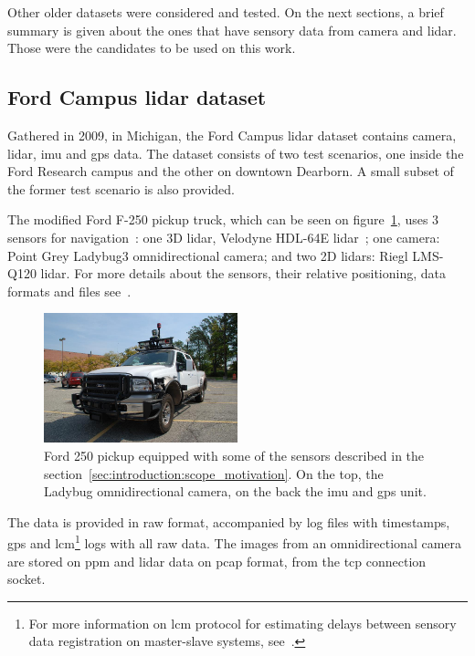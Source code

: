 Other older datasets were considered and tested. On the next sections, a brief summary is given about the ones that have sensory data from camera and \ac{lidar}. Those were the candidates to be used on this work.

\subsection{Ford Campus \acl{lidar} dataset}
Gathered in 2009, in Michigan, the Ford Campus \ac{lidar} dataset contains camera, \ac{lidar}, \acf{imu} and \acf{gps} data\cite{Pandey2011}. The dataset consists of two test scenarios, one inside the Ford Research campus and the other on downtown Dearborn. A small subset of the former test scenario is also provided.

The modified Ford F-250 pickup truck, which can be seen on figure~\ref{fig:sota:ford_sensors}, uses 3 sensors for navigation~\cite{Pandey2011}: one 3D \ac{lidar}, Velodyne HDL-64E \ac{lidar}~\cite{VelodyneHDL64}; one camera: Point Grey Ladybug3 omnidirectional camera; and two 2D \acp{lidar}: Riegl LMS-Q120 lidar. For more details about the sensors, their relative positioning, data formats and files see~\cite{Pandey2011}.

\begin{figure}[!ht]
	\centering
	\includegraphics[width=0.5\textwidth]{img/sensor_fusion/ford_sensors.jpg}
	\caption{Ford 250 pickup equipped with some of the sensors described in the section~\ref{sec:introduction:scope_motivation}. On the top, the Ladybug omnidirectional camera, on the back the \ac{imu} and \ac{gps} unit.}
	\label{fig:sota:ford_sensors}
\end{figure}

The data is provided in raw format, accompanied by log files with timestamps, \ac{gps} and \ac{lcm}\footnote{For more information on \acf{lcm} protocol for estimating delays between sensory data registration on master-slave systems, see~\cite{LCM}.} logs with all raw data. The images from an omnidirectional camera%
are stored on \ac{ppm} and \ac{lidar} data %
on \ac{pcap} format, from the \ac{tcp} connection socket.%

